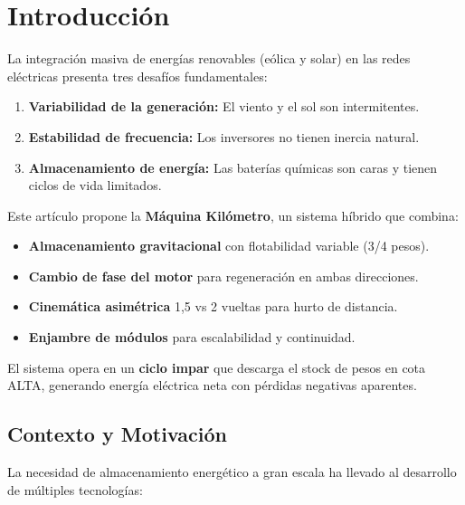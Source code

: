 \documentclass[12pt,a4paper]{article}
\begin{document}
\tableofcontents
\newpage

\section{Introducción}

La integración masiva de energías renovables (eólica y solar) en las redes eléctricas presenta tres desafíos fundamentales:

\begin{enumerate}[label=(\arabic*)]
    \item \textbf{Variabilidad de la generación:} El viento y el sol son intermitentes.
    \item \textbf{Estabilidad de frecuencia:} Los inversores no tienen inercia natural.
    \item \textbf{Almacenamiento de energía:} Las baterías químicas son caras y tienen ciclos de vida limitados.
\end{enumerate}

Este artículo propone la \textbf{Máquina Kilómetro}, un sistema híbrido que combina:

\begin{itemize}
    \item \textbf{Almacenamiento gravitacional} con flotabilidad variable (3/4 pesos).
    \item \textbf{Cambio de fase del motor} para regeneración en ambas direcciones.
    \item \textbf{Cinemática asimétrica} 1,5 vs 2 vueltas para hurto de distancia.
    \item \textbf{Enjambre de módulos} para escalabilidad y continuidad.
\end{itemize}

El sistema opera en un \textbf{ciclo impar} que descarga el stock de pesos en cota ALTA, generando energía eléctrica neta con pérdidas negativas aparentes.

\subsection{Contexto y Motivación}

La necesidad de almacenamiento energético a gran escala ha llevado al desarrollo de múltiples tecnologías:
\end{document}
